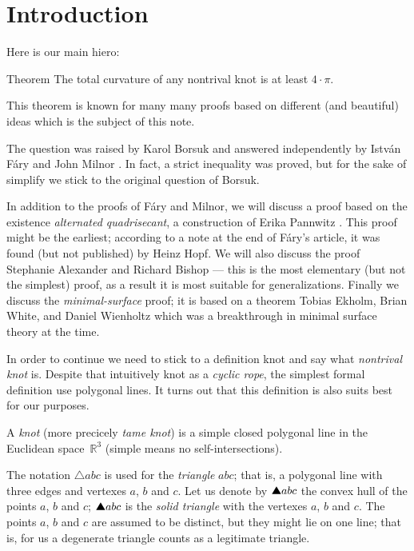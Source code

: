 \section{Introduction}

Here is our main hiero:

\begin{thm}{Theorem}\label{thm:fary-milnor}
The total curvature of any nontrival knot is at least $4\cdot\pi$. 
\end{thm}

This theorem is known for many many proofs based on different (and beautiful) ideas which is the subject of this note.

The question was raised by Karol Borsuk \cite{borsuk} and answered independently by Istv\'an F\'ary and John Milnor \cite{fary, milnor}.
In fact, a strict inequality was proved, but for the sake of simplify we stick to the original question of Borsuk.

In addition to the proofs of F\'ary and Milnor,
we will discuss a proof based on the existence \emph{alternated quadrisecant}, a construction of Erika Pannwitz \cite{pannwitz}.
This proof might be the earliest; according to a note at the end of Fáry’s article, it was found (but not published) by Heinz Hopf.
We will also discuss the proof Stephanie Alexander and Richard Bishop --- this is the most elementary (but not the simplest) proof, as a result it is most suitable for generalizations.
Finally we discuss the \emph{minimal-surface} proof;
it is based on a theorem Tobias Ekholm, Brian White, and Daniel Wienholtz \cite{EWW_embed} which was a breakthrough in minimal surface theory at the time.

In order to continue we need to stick to a definition knot and say what \emph{nontrival knot} is.
Despite that intuitively knot as a \emph{cyclic rope},
the simplest formal definition use polygonal lines.
It turns out that this definition is also suits best for our purposes.

A \emph{knot} (more precicely \emph{tame knot}) is a simple closed polygonal line in the Euclidean space~$\mathbb{R}^3$ (simple means no self-intersections).

The notation $\triangle abc$ is used for the \emph{triangle} $abc$; that is, a polygonal line with three edges and vertexes $a$, $b$ and $c$.
Let us denote by $\solidtriangle abc$ the convex hull of the points $a$, $b$ and $c$; $\solidtriangle abc$ is the \emph{solid triangle} with the vertexes $a$, $b$ and $c$.
The points $a$, $b$ and $c$ are assumed to be distinct, but they might lie on one line;
that is, for us a degenerate triangle counts as a legitimate triangle.

